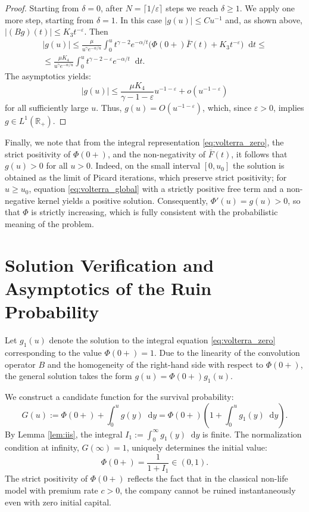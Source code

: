 \documentclass[smallextended]{svjour3}
\providecommand{\diff}{\mathop{}\!\mathrm{d}}
\begin{document}
\begin{proof}
Starting from $\delta = 0$, after $N = \lceil 1/\varepsilon \rceil$ steps we reach $\delta \ge 1$. We apply one more step, starting from $\delta = 1$. In this case $|g(u)| \le C u^{-1}$ and, as shown above, $|(Bg)(t)| \le K_3 t^{-\varepsilon}$. Then
\begin{multline*}
|g(u)| \le \frac{\mu}{u^\gamma e^{-\alpha/u}} \int_0^u t^{\gamma-2} e^{-\alpha/t} \bigl( \Phi(0+)\bar F(t) + K_3 t^{-\varepsilon} \bigr) \diff t
\le
\\
\le \frac{\mu K_4}{u^\gamma e^{-\alpha/u}} \int_0^u t^{\gamma-2-\varepsilon} e^{-\alpha/t} \diff t.
\end{multline*}
The asymptotics yields:
\[
|g(u)| \le \frac{\mu K_4}{\gamma-1-\varepsilon} u^{-1-\varepsilon} + o(u^{-1-\varepsilon})
\]
for all sufficiently large $u$. Thus, $g(u) = O(u^{-1-\varepsilon})$, which, since $\varepsilon>0$, implies $g \in L^1(\mathbb{R}_+)$.
\end{proof}

Finally, we note that from the integral representation \eqref{eq:volterra_zero}, the strict positivity of $\Phi(0+)$, and the non-negativity of $\bar F(t)$, it follows that $g(u) > 0$ for all $u>0$. Indeed, on the small interval $[0,u_0]$ the solution is obtained as the limit of Picard iterations, which preserve strict positivity; for $u \ge u_0$, equation \eqref{eq:volterra_global} with a strictly positive free term and a non-negative kernel yields a positive solution. Consequently, $\Phi'(u) = g(u) > 0$, so that $\Phi$ is strictly increasing, which is fully consistent with the probabilistic meaning of the problem.

\section{Solution Verification and Asymptotics of the Ruin Probability}
\label{sec:identification}

Let $g_1(u)$ denote the solution to the integral equation \eqref{eq:volterra_zero} corresponding to the value $\Phi(0+) = 1$. Due to the linearity of the convolution operator $B$ and the homogeneity of the right-hand side with respect to $\Phi(0+)$, the general solution takes the form $g(u) = \Phi(0+) g_1(u)$. 

We construct a candidate function for the survival probability:
\begin{equation}\label{eq:G_candidate}
G(u) := \Phi(0+) + \int_0^u g(y) \diff y = \Phi(0+) \left( 1 + \int_0^u g_1(y) \diff y \right).
\end{equation}
By Lemma \ref{lem:iis}, the integral $I_1 := \int_0^\infty g_1(y) \diff y$ is finite. The normalization condition at infinity, $G(\infty)=1$, uniquely determines the initial value:
\begin{equation}\label{eq:phi_zero}
\Phi(0+) = \frac{1}{1 + I_1} \in (0,1).
\end{equation}
The strict positivity of $\Phi(0+)$ reflects the fact that in the classical non-life model with premium rate $c>0$, the company cannot be ruined instantaneously even with zero initial capital.
\end{document}
